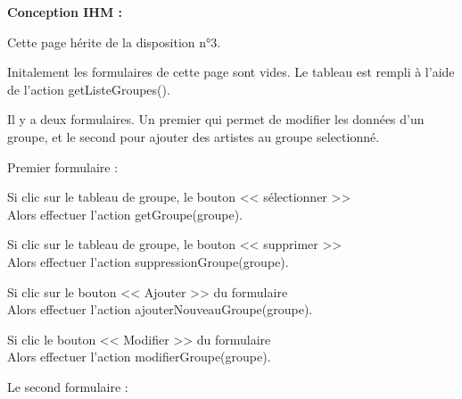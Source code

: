 			\begin{paragraphe}
				\textbf{Conception IHM :}
			\end{paragraphe}

			\begin{paragraphe}
				Cette page hérite de la disposition n°3.\par
				Initalement les formulaires de cette page sont vides.
				Le tableau est rempli à l'aide de l'action getListeGroupes().
			\end{paragraphe}


			\begin{paragraphe}
				Il y a deux formulaires. Un premier qui permet de modifier les données d'un groupe, et le second pour ajouter des artistes au groupe selectionné.
			\end{paragraphe}

			\begin{paragraphe}
				Premier formulaire :
			\end{paragraphe}

			\begin{paragraphe}
				Si clic sur le tableau de groupe, le bouton << sélectionner >> \\
				Alors effectuer l'action getGroupe(groupe).
			\end{paragraphe}

			\begin{paragraphe}
				Si clic sur le tableau de groupe, le bouton << supprimer >> \\
				Alors effectuer l'action suppressionGroupe(groupe).
			\end{paragraphe}

			\begin{paragraphe}
				Si clic sur le bouton << Ajouter >> du formulaire \\
				Alors effectuer l'action ajouterNouveauGroupe(groupe).
			\end{paragraphe}

			\begin{paragraphe}
				Si clic le bouton << Modifier >> du formulaire \\
				Alors effectuer l'action modifierGroupe(groupe).
			\end{paragraphe}

			\begin{paragraphe}
				Le second formulaire :
			\end{paragraphe}

